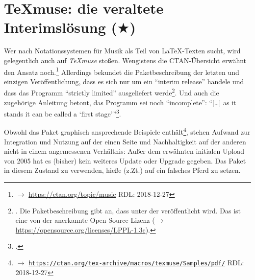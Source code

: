 %
%
%



\section{{\TeX}muse: die veraltete Interimslösung ($\bigstar$)}

Wer nach Notationssystemen für Musik als Teil von \LaTeX-Texten sucht, wird
gelegentlich auch auf \textit{{\TeX}muse} stoßen. Wengistens die CTAN-Übersicht
erwähnt den Ansatz noch.\footnote{$\rightarrow$
\href{https://ctan.org/topic/music} {https://ctan.org/topic/music} RDL:
2018-12-27} Allerdings bekundet die Paketbeschreibung der letzten und einzigen
Veröffentlichung, dass es sich nur um ein \enquote{in­terim re­lease} handele
und dass das Programm \enquote{strictly lim­ited} ausgeliefert
werde\footnote{\cite[vgl.][\nopage wp.]{CtanTexmuse2005a}. Die Paket\-beschreibung
gibt an, dass  unter der 
veröffentlicht wird. Das ist eine von der  anerkannte
Open-Source-Lizenz ($\rightarrow$
\href{https://opensource.org/licenses/LPPL-1.3c}
{https://opensource.org/licenses/LPPL-1.3c}).}. Und auch die zugehörige
Anleitung betont, das Programm sei noch \enquote{incomplete}: \enquote{[\ldots]
as it stands it can be called a ‘first stage'}\footcite[vgl.][1]{Garcia2005a}.

Obwohl das Paket graphisch ansprechende Beispiele enthält\footnote{$\rightarrow$
\href{https://ctan.org/tex-archive/macros/texmuse/Samples/pdf/}
{\texttt{https://ctan.org/tex-archive/macros/texmuse/Samples/pdf/}} RDL:
2018-12-27}, stehen Aufwand zur Integration und Nutzung auf der einen Seite und
Nachhaltigkeit auf der anderen nicht in einem angemessenen Verhältnis: Außer dem
erwähnten initialen Upload von 2005 hat es (bisher) kein weiteres Update oder
Upgrade gegeben. Das Paket in diesem Zustand zu verwenden, hieße (z.Zt.) auf ein
falsches Pferd zu setzen.


%
